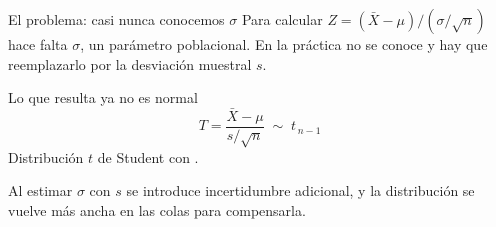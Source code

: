 \documentclass[aspectratio=169,10pt]{beamer}
\begin{document}
\begin{frame}{El problema: casi nunca conocemos $\sigma$}
  Para calcular $Z=(\bar{X}-\mu)/(\sigma/\sqrt{n})$ hace falta $\sigma$, un
  parámetro poblacional. En la práctica no se conoce y hay que reemplazarlo por
  la desviación muestral $s$.

  \vspace{0.25cm}
  \begin{block}{Lo que resulta ya no es normal}
    \[ T=\frac{\bar{X}-\mu}{s/\sqrt{n}} \;\sim\; t_{\,n-1} \]
    Distribución $t$ de Student con .
  \end{block}

  \vspace{0.2cm}
  {\footnotesize\color{uniGris} Al estimar $\sigma$ con $s$ se introduce
  incertidumbre adicional, y la distribución se vuelve más ancha en las colas
  para compensarla.}
\end{frame}
\end{document}

